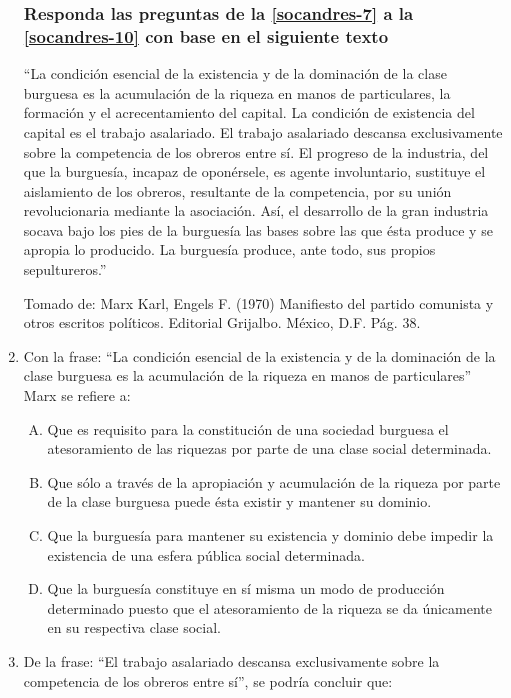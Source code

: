 \begin{enumerate}
\subsubsection*{Responda las preguntas de la \ref{socandres-7} a la \ref{socandres-10} con base en el siguiente texto}
``La condición esencial de la existencia y de la dominación de la clase burguesa es la acumulación de la riqueza en manos de particulares, la formación y el acrecentamiento del capital. La condición de existencia del capital es el trabajo asalariado. El trabajo asalariado descansa exclusivamente sobre la competencia de los obreros entre sí. El progreso de la industria, del que la burguesía, incapaz de oponérsele, es agente involuntario, sustituye el aislamiento de los obreros, resultante de la competencia, por su unión revolucionaria mediante la asociación. Así, el desarrollo de la gran industria socava bajo los pies de la burguesía las bases sobre las que ésta produce y se apropia lo producido. La burguesía produce, ante todo, sus propios sepultureros.''\\
\begin{footnotesize}
Tomado de: Marx Karl, Engels F. (1970) Manifiesto del partido comunista y otros escritos políticos. Editorial Grijalbo. México, D.F. Pág. 38.
\end{footnotesize}

\item Con la frase: “La condición esencial de la existencia y de la dominación de la clase burguesa es la acumulación de la riqueza en manos de particulares” Marx se refiere a:\label{socandres-7}

\begin{enumerate}[(A)]
\item Que es requisito para la constitución de una sociedad burguesa el atesoramiento de las riquezas por parte de una clase social determinada.
\item Que sólo a través de la apropiación y acumulación de la riqueza por parte de la clase burguesa puede ésta existir y mantener su dominio.
\item Que la burguesía para mantener su existencia y dominio debe impedir la existencia de una esfera pública social determinada.
\item Que la burguesía constituye en sí misma un modo de producción determinado puesto que el atesoramiento de la riqueza se da únicamente en su respectiva clase social.
\end{enumerate}

\item De la frase: “El trabajo asalariado descansa exclusivamente sobre la competencia de los obreros entre sí”, se podría concluir que:\label{socandres-8}


\end{enumerate}

